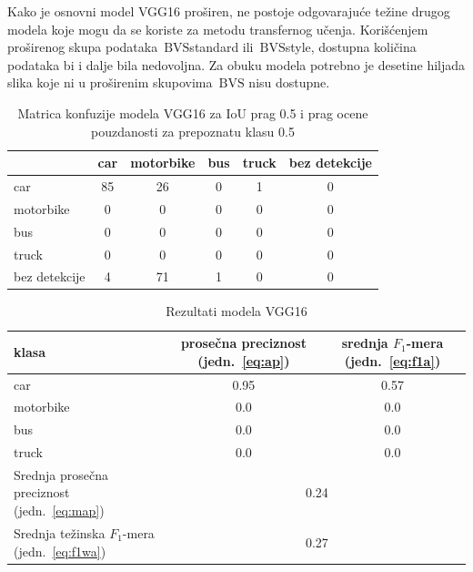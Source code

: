 \documentclass[12pt,oneside]{memoir}
\newcommand{\bvs}{\ensuremath{\,\textrm{BVS}}}
\begin{document}
Kako je osnovni model VGG16 proširen, ne postoje odgovarajuće težine drugog modela koje mogu da se koriste za metodu transfernog učenja. Korišćenjem proširenog skupa podataka \bvs{standard} ili \bvs{style}, dostupna količina podataka bi i dalje bila nedovoljna. Za obuku modela potrebno je desetine hiljada slika koje ni u proširenim skupovima \bvs{} nisu dostupne.

\begin{table}[h!]
    \begin{center}
    \caption{Matrica konfuzije modela VGG16 za IoU prag 0.5 i prag ocene pouzdanosti za prepoznatu klasu 0.5}
    \begin{tabular}{ l|c|c|c|c|c|}
                  & car  & motorbike & bus & truck & bez detekcije \\ \hline
    car           & 85   & 26        & 0   & 1     & 0             \\ 
    motorbike     & 0    & 0         & 0   & 0     & 0             \\ 
    bus           & 0    & 0         & 0   & 0     & 0             \\ 
    truck         & 0    & 0         & 0   & 0     & 0             \\ 
    bez detekcije & 4    & 71        & 1   & 0     & 0             \\ \hline
    \hline
    \end{tabular}
    \label{tab:section4_vgg16_confusionmatrix}
    \end{center}
\end{table}


\begin{table}[h!]
    \begin{center}
    \caption{Rezultati modela VGG16}
    \begin{tabular}{|m{10em}|c|c|}
        \toprule
        klasa     & prosečna preciznost (jedn.~\ref{eq:ap}) & srednja $F_1$-mera (jedn.~\ref{eq:f1a})  \\ \hline
        \midrule
        car       & 0.95  & 0.57 \\ \hline
        motorbike & 0.0   & 0.0 \\ \hline
        bus       & 0.0   & 0.0 \\ \hline
        truck     & 0.0   & 0.0 \\ \hline
        \bottomrule
        Srednja prosečna preciznost (jedn.~\ref{eq:map}) & \multicolumn{2}{c|}{0.24}  \\ \hline
        Srednja težinska $F_1$-mera (jedn.~\ref{eq:f1wa}) & \multicolumn{2}{c|}{0.27}  \\ \hline
    \end{tabular}
    \label{tab:section4_vgg16_results}
    \end{center}
\end{table}
\end{document}
